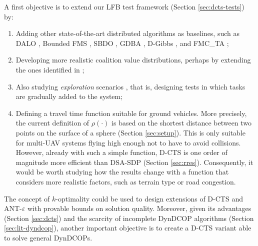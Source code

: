 A first objective is to extend our LFB test framework (Section \ref{sec:dcts-tests}) by:
\begin{enumerate}
    \item Adding other state-of-the-art distributed algorithms as baselines, such as DALO
        \cite{kiekintveld2010}, Bounded FMS \cite{macarthur2010}, SBDO \cite{billiau2012},
        GDBA \cite{okamoto2016}, D-Gibbs \cite{nguyen2019}, and FMC\_TA
        \cite{nelke2020,tkach2021};
    \item Developing more realistic coalition value distributions, perhaps by extending
        the ones identified in \cite[Section $5.1$]{changder2021};
    \item Also studying \emph{exploration} scenarios \cite{fioretto2018survey}, that is,
        designing tests in which tasks are gradually added to the system;
    \item Defining a travel time function suitable for ground vehicles. More
        precisely, the current definition of $\rho(\cdot)$ is based on the shortest
        distance between two points on the surface of a sphere (Section \ref{sec:setup}).
        This is only suitable for multi-UAV systems flying high enough not to have to
        avoid collisions. However, already with such a simple function, D-CTS is one order
        of magnitude more efficient than DSA-SDP (Section \ref{sec:rres}). Consequently,
        it would be worth studying how the results change with a function that considers
        more realistic factors, such as terrain type or road congestion.
\end{enumerate}
The concept of $k$-optimality \cite{service2011, farinelli2013dcop} could be used to
design extensions of D-CTS and ANT-$\varepsilon$ with provable bounds on solution quality.
Moreover, given its advantages (Section \ref{sec:dcts}) and the scarcity of incomplete
DynDCOP algorithms (Section \ref{sec:lit-dyndcop}), another important objective is to
create a D-CTS variant able to solve general DynDCOPs.

